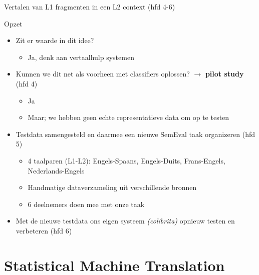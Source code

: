 \documentclass[8pt]{beamer}
\begin{document}
\begin{frame}{Vertalen van L1 fragmenten in een L2 context (hfd 4-6)}
    \begin{block}{Opzet}
        \begin{itemize}
            \item Zit er waarde in dit idee?
            \begin{itemize}
                \item Ja, denk aan vertaalhulp systemen
            \end{itemize}
            \item Kunnen we dit net als voorheen met classifiers oplossen? $\rightarrow$ \textbf{pilot study} (hfd 4)
            \begin{itemize}
                \item Ja
                \item Maar; we hebben geen echte representatieve data om op te testen
            \end{itemize}
            \item Testdata samengesteld en daarmee een nieuwe SemEval taak organizeren (hfd 5)
            \begin{itemize}
                \item 4 taalparen (L1-L2): Engels-Spaans, Engels-Duits, Frans-Engels, Nederlands-Engels
                \item Handmatige dataverzameling uit verschillende bronnen
                \item 6 deelnemers doen mee met onze taak
            \end{itemize}
            \item Met de nieuwe testdata ons eigen systeem \emph{(colibrita)} opnieuw testen en verbeteren (hfd 6)
        \end{itemize}
    \end{block}
\end{frame}

\section{Statistical Machine Translation}
\end{document}
